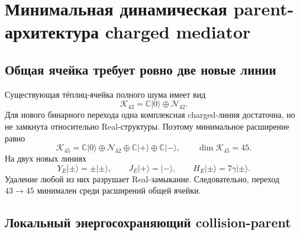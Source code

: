 \chapter{Минимальная динамическая parent-архитектура charged mediator}
\label{ch:v8-charged-mediator-minimal-dynamic-parent}

\section{Общая ячейка требует ровно две новые линии}

Существующая тёплиц-ячейка полного шума имеет вид
\begin{equation}
 \mathcal K_{43}=\mathbb C|0\rangle\oplus\mathcal N_{42}.
 \label{eq:v8-mediator-dynamic-old-cell}
\end{equation}
Для нового бинарного перехода одна комплексная charged-линия достаточна,
но не замкнута относительно Real-структуры. Поэтому минимальное расширение
равно
\begin{equation}
 \mathcal K_{45}=\mathbb C|0\rangle\oplus\mathcal N_{42}
 \oplus\mathbb C|+\rangle\oplus\mathbb C|-\rangle,
 \qquad \dim\mathcal K_{45}=45.
 \label{eq:v8-mediator-dynamic-extended-cell}
\end{equation}
На двух новых линиях
\begin{equation}
 Y_E|\pm\rangle=\pm|\pm\rangle,
 \qquad J_E|+\rangle=|-\rangle,
 \qquad H_E|\pm\rangle=7\gamma|\pm\rangle.
 \label{eq:v8-mediator-dynamic-real-energy-pair}
\end{equation}
Удаление любой из них разрушает Real-замыкание. Следовательно, переход
$43\to45$ минимален среди расширений общей ячейки.

\section{Локальный энергосохраняющий collision-parent}

